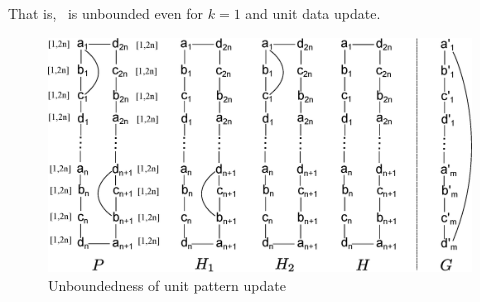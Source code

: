 \vspace{-1.5ex}
That is, \dynteamF\, is unbounded even for $k=1$ and unit data update.

\vspace{-1ex}
\begin{figure}[ht!]
\label{fig-inc-complexity-pattern}
\begin{center}
\includegraphics[scale=0.31]{./fig/inc-complexity-proof-pattern.eps}
\end{center}
\vspace{-3ex}
\caption{Unboundedness of unit pattern update}
\vspace{-4ex}
\end{figure}

